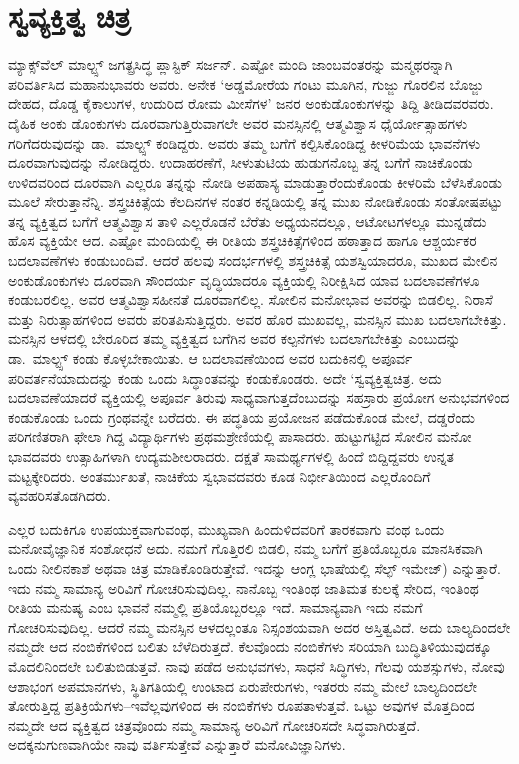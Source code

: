 \section*{ಸ್ವವ್ಯಕ್ತಿತ್ವ ಚಿತ್ರ}


ಮ್ಯಾಕ್ಸ್​ವೆಲ್ ಮಾಲ್ಟ್ಸ್ ಜಗತ್ಪ್ರಸಿದ್ಧ ಪ್ಲಾಸ್ಟಿಕ್ ಸರ್ಜನ್. ಎಷ್ಟೋ ಮಂದಿ ಜಾಂಬವಂತರನ್ನು ಮನ್ಮಥರನ್ನಾಗಿ ಪರಿವರ್ತಿಸಿದ ಮಹಾನುಭಾವರು ಅವರು. ಅನೇಕ ‘ಅಡ್ಡಮೋರೆಯ ಗಂಟು ಮೂಗಿನ, ಗುಜ್ಜು ಗೊರಲಿನ ಬೊಜ್ಜು ದೇಹದ, ದೊಡ್ಡ ಕೈಕಾಲುಗಳ, ಉದುರಿದ ರೋಮ ಮೀಸೆಗಳ’ ಜನರ ಅಂಕುಡೊಂಕುಗಳನ್ನು ತಿದ್ದಿ ತೀಡಿದವರವರು. ದೈಹಿಕ ಅಂಕು ಡೊಂಕುಗಳು ದೂರವಾಗುತ್ತಿರುವಾಗಲೇ ಅವರ ಮನಸ್ಸಿನಲ್ಲಿ ಆತ್ಮವಿಶ್ವಾಸ ಧೈರ್ಯೋತ್ಸಾಹಗಳು ಗರಿಗೆದರುವುದನ್ನು ಡಾ.\ ಮಾಲ್ಟ್ಸ್ ಕಂಡಿದ್ದರು. ಅವರು ತಮ್ಮ ಬಗೆಗೆ ಕಲ್ಪಿಸಿಕೊಂಡಿದ್ದ ಕೀಳರಿಮೆಯ ಭಾವನೆಗಳು ದೂರವಾಗುವುದನ್ನು ನೋಡಿದ್ದರು. ಉದಾಹರಣೆಗೆ, ಸೀಳುತುಟಿಯ ಹುಡುಗನೊಬ್ಬ ತನ್ನ ಬಗೆಗೆ ನಾಚಿಕೊಂಡು ಉಳಿದವರಿಂದ ದೂರವಾಗಿ ಎಲ್ಲರೂ ತನ್ನನ್ನು ನೋಡಿ ಅಪಹಾಸ್ಯ ಮಾಡುತ್ತಾರೆಂದುಕೊಂಡು ಕೀಳರಿಮೆ ಬೆಳೆಸಿಕೊಂಡು ಮೂಲೆ ಸೇರುತ್ತಾನೆನ್ನಿ. ಶಸ್ತ್ರಚಿಕಿತ್ಸೆಯ ಕೆಲದಿನಗಳ ನಂತರ ಕನ್ನಡಿಯಲ್ಲಿ ತನ್ನ ಮುಖ ನೋಡಿಕೊಂಡು ಸಂತೋಷಪಟ್ಟು ತನ್ನ ವ್ಯಕ್ತಿತ್ವದ ಬಗೆಗೆ ಆತ್ಮವಿಶ್ವಾಸ ತಾಳಿ ಎಲ್ಲರೊಡನೆ ಬೆರೆತು ಅಧ್ಯಯನದಲ್ಲೂ, ಆಟೋಟಗಳಲ್ಲೂ ಮುನ್ನಡೆದು ಹೊಸ ವ್ಯಕ್ತಿಯೇ ಆದ. ಎಷ್ಟೋ ಮಂದಿಯಲ್ಲಿ ಈ ರೀತಿಯ ಶಸ್ತ್ರಚಿಕಿತ್ಸೆಗಳಿಂದ ಹಠಾತ್ತಾದ ಹಾಗೂ ಆಶ್ಚರ್ಯಕರ ಬದಲಾವಣೆಗಳು ಕಂಡುಬಂದಿವೆ. ಆದರೆ ಹಲವು ಸಂದರ್ಭಗಳಲ್ಲಿ ಶಸ್ತ್ರಚಿಕಿತ್ಸೆ ಯಶಸ್ವಿಯಾದರೂ, ಮುಖದ ಮೇಲಿನ ಅಂಕುಡೊಂಕುಗಳು ದೂರವಾಗಿ ಸೌಂದರ್ಯ ವೃದ್ಧಿಯಾದರೂ ವ್ಯಕ್ತಿಯಲ್ಲಿ ನಿರೀಕ್ಷಿಸಿದ ಯಾವ ಬದಲಾವಣೆಗಳೂ ಕಂಡುಬರಲಿಲ್ಲ. ಅವರ ಆತ್ಮವಿಶ್ವಾಸಹೀನತೆ ದೂರವಾಗಲಿಲ್ಲ. ಸೋಲಿನ ಮನೋಭಾವ ಅವರನ್ನು ಬಿಡಲಿಲ್ಲ. ನಿರಾಸೆ ಮತ್ತು ನಿರುತ್ಸಾಹಗಳಿಂದ ಅವರು ಪರಿತಪಿಸುತ್ತಿದ್ದರು. ಅವರ ಹೊರ ಮುಖವಲ್ಲ, ಮನಸ್ಸಿನ ಮುಖ ಬದಲಾಗಬೇಕಿತ್ತು. ಮನಸ್ಸಿನ ಆಳದಲ್ಲಿ ಬೇರೂರಿದ ತಮ್ಮ ವ್ಯಕ್ತಿತ್ವದ ಬಗೆಗಿನ ಅವರ ಕಲ್ಪನೆಗಳು ಬದಲಾಗಬೇಕಿತ್ತು ಎಂಬುದನ್ನು ಡಾ.\ ಮಾಲ್ಟ್ಸ್ ಕಂಡು ಕೊಳ್ಳಬೇಕಾಯಿತು. ಆ ಬದಲಾವಣೆಯಿಂದ ಅವರ ಬದುಕಿನಲ್ಲಿ ಅಪೂರ್ವ ಪರಿವರ್ತನೆಯಾದುದನ್ನು ಕಂಡು ಒಂದು ಸಿದ್ಧಾಂತವನ್ನು ಕಂಡುಕೊಂಡರು. ಅದೇ ‘ಸ್ವವ್ಯಕ್ತಿತ್ವಚಿತ್ರ. ಅದು ಬದಲಾವಣೆಯಾದರೆ ವ್ಯಕ್ತಿಯಲ್ಲಿ ಅಪೂರ್ವ ತಿರುವು ಸಾಧ್ಯವಾಗುತ್ತದೆಂಬುದನ್ನು ಸಹಸ್ರಾರು ಪ್ರಯೋಗ ಅನುಭವಗಳಿಂದ ಕಂಡುಕೊಂಡು ಒಂದು ಗ್ರಂಥವನ್ನೇ ಬರೆದರು. ಈ ಪದ್ಧತಿಯ ಪ್ರಯೋಜನ ಪಡೆದುಕೊಂಡ ಮೇಲೆ, ದಡ್ಡರೆಂದು ಪರಿಗಣಿತರಾಗಿ ಫೇಲಾ ಗಿದ್ದ ವಿದ್ಯಾರ್ಥಿಗಳು ಪ್ರಥಮಶ್ರೇಣಿಯಲ್ಲಿ ಪಾಸಾದರು. ಹುಟ್ಟುಗಟ್ಟಿದ ಸೋಲಿನ ಮನೋ ಭಾವದವರು ಉತ್ಸಾಹಿಗಳಾಗಿ ಉದ್ಯಮಶೀಲರಾದರು. ದಕ್ಷತೆ ಸಾಮರ್ಥ್ಯಗಳಲ್ಲಿ ಹಿಂದೆ ಬಿದ್ದಿದ್ದವರು ಉನ್ನತ ಮಟ್ಟಕ್ಕೇರಿದರು. ಅಂತರ್ಮುಖತೆ, ನಾಚಿಕೆಯ ಸ್ವಭಾವದವರು ಕೂಡ ನಿರ್ಭೀತಿಯಿಂದ ಎಲ್ಲರೊಂದಿಗೆ ವ್ಯವಹರಿಸತೊಡಗಿದರು.

\newpage

ಎಲ್ಲರ ಬದುಕಿಗೂ ಉಪಯುಕ್ತವಾಗುವಂಥ, ಮುಖ್ಯವಾಗಿ ಹಿಂದುಳಿದವರಿಗೆ ತಾರಕವಾಗು ವಂಥ ಒಂದು ಮನೋವೈಜ್ಞಾನಿಕ ಸಂಶೋಧನೆ ಅದು. ನಮಗೆ ಗೊತ್ತಿರಲಿ ಬಿಡಲಿ, ನಮ್ಮ ಬಗೆಗೆ ಪ್ರತಿಯೊಬ್ಬರೂ ಮಾನಸಿಕವಾಗಿ ಒಂದು ನೀಲಿನಕಾಶೆ ಅಥವಾ ಚಿತ್ರ ಮಾಡಿಕೊಂಡಿರುತ್ತೇವೆ. ಇದನ್ನು ಆಂಗ್ಲ ಭಾಷೆಯಲ್ಲಿ ಸೆಲ್ಫ್ ಇಮೇಜ್​) ಎನ್ನುತ್ತಾರೆ. ಇದು ನಮ್ಮ ಸಾಮಾನ್ಯ ಅರಿವಿಗೆ ಗೋಚರಿಸುವುದಿಲ್ಲ. ನಾನೊಬ್ಬ ಇಂತಿಂಥ ಜಾತಿಮತ ಕುಲಕ್ಕೆ ಸೇರಿದ, ಇಂತಿಂಥ ರೀತಿಯ ಮನುಷ್ಯ ಎಂಬ ಭಾವನೆ ನಮ್ಮಲ್ಲಿ ಪ್ರತಿಯೊಬ್ಬರಲ್ಲೂ ಇದೆ. ಸಾಮಾನ್ಯವಾಗಿ ಇದು ನಮಗೆ ಗೋಚರಿಸುವುದಿಲ್ಲ. ಆದರೆ ನಮ್ಮ ಮನಸ್ಸಿನ ಆಳದಲ್ಲಂತೂ ನಿಸ್ಸಂಶಯವಾಗಿ ಅದರ ಅಸ್ತಿತ್ವವಿದೆ. ಅದು ಬಾಲ್ಯದಿಂದಲೇ ನಮ್ಮದೇ ಆದ ನಂಬಿಕೆಗಳಿಂದ ಬಲಿತು ಬೆಳೆದಿರುತ್ತದೆ. ಕೆಲವೊಂದು ನಂಬಿಕೆಗಳು ಸರಿಯಾಗಿ ಬುದ್ಧಿತಿಳಿಯುವುದಕ್ಕೂ ಮೊದಲಿನಿಂದಲೇ ಬಲಿತುಬಿಡುತ್ತವೆ. ನಾವು ಪಡೆದ ಅನುಭವಗಳು, ಸಾಧನೆ ಸಿದ್ಧಿಗಳು, ಗೆಲವು ಯಶಸ್ಸುಗಳು, ನೋವು ಆಶಾಭಂಗ ಅಪಮಾನಗಳು, ಸ್ಥಿತಿಗತಿಯಲ್ಲಿ ಉಂಟಾದ ಏರುಪೇರುಗಳು, ಇತರರು ನಮ್ಮ ಮೇಲೆ ಬಾಲ್ಯದಿಂದಲೇ ತೋರುತ್ತಿದ್ದ ಪ್ರತಿಕ್ರಿಯೆಗಳು–ಇವೆಲ್ಲವುಗಳಿಂದ ಈ ನಂಬಿಕೆಗಳು ರೂಪತಾಳುತ್ತವೆ. ಒಟ್ಟು ಅವುಗಳ ಮೊತ್ತದಿಂದ ನಮ್ಮದೇ ಆದ ವ್ಯಕ್ತಿತ್ವದ ಚಿತ್ರವೊಂದು ನಮ್ಮ ಸಾಮಾನ್ಯ ಅರಿವಿಗೆ ಗೋಚರಿಸದೇ ಸಿದ್ಧವಾಗಿರುತ್ತದೆ. ಅದಕ್ಕನುಗುಣವಾಗಿಯೇ ನಾವು ವರ್ತಿಸುತ್ತೇವೆ ಎನ್ನುತ್ತಾರೆ ಮನೋವಿಜ್ಞಾನಿಗಳು.

